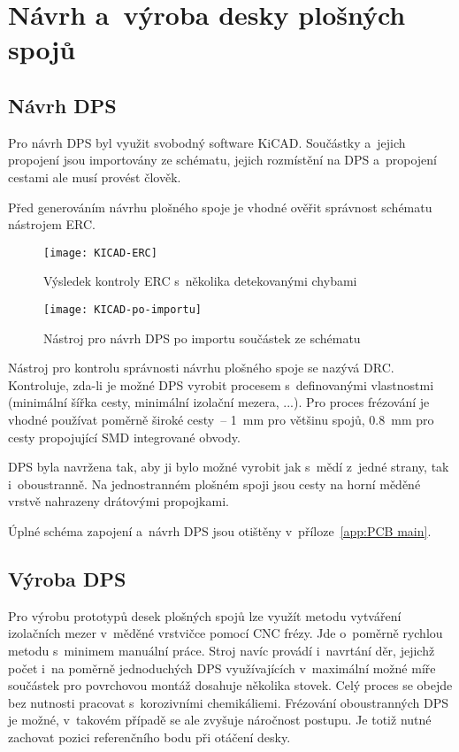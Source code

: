 \section{Návrh a~výroba desky plošných spojů}
\subsection{Návrh DPS}
Pro návrh DPS byl využit svobodný software KiCAD. Součástky a~jejich propojení
jsou importovány ze schématu, jejich rozmístění na DPS a~propojení cestami ale
musí provést člověk.

Před generováním návrhu plošného spoje je vhodné ověřit správnost schématu
nástrojem \ac{ERC}.

\begin{figure}[htbp]
    \centering
    \texttt{[image: KICAD-ERC]}
    \caption{Výsledek kontroly \acs{ERC} s~několika detekovanými chybami}
    \label{fig:kicad ERC}
\end{figure}

\begin{figure}[htbp]
    \centering
    \texttt{[image: KICAD-po-importu]}
    \caption{%
        Nástroj pro návrh DPS  po importu součástek ze
        schématu
    }
    \label{fig:kicad po importu}
\end{figure}

Nástroj pro kontrolu správnosti návrhu plošného spoje se nazývá \ac{DRC}.
Kontroluje, zda-li je možné DPS vyrobit procesem s~definovanými vlastnostmi
(minimální šířka cesty, minimální izolační mezera, ...). Pro proces frézování
je vhodné používat poměrně široké cesty~-- \SI{1}{\milli\meter} pro většinu
spojů, \SI{0,8}{\milli\meter} pro cesty propojující SMD integrované obvody.

DPS byla navržena tak, aby ji bylo možné vyrobit jak s~mědí z~jedné strany,
tak i~oboustranně. Na jednostranném plošném spoji jsou cesty na horní měděné
vrstvě nahrazeny drátovými propojkami.

Úplné schéma zapojení a~návrh DPS jsou otištěny v~příloze~\vref{app:PCB main}.


\subsection{Výroba DPS}
Pro výrobu prototypů desek plošných spojů lze využít metodu vytváření
izolačních mezer v~měděné vrstvičce pomocí CNC frézy. Jde o~poměrně rychlou
metodu s~minimem manuální práce. Stroj navíc provádí i~navrtání děr, jejichž
počet i~na poměrně jednoduchých DPS využívajících v~maximální možné míře
součástek pro povrchovou montáž dosahuje několika stovek. Celý proces se obejde
bez nutnosti pracovat s~korozivními chemikáliemi. Frézování oboustranných DPS
je možné, v~takovém případě se ale zvyšuje náročnost postupu. Je totiž nutné
zachovat pozici referenčního bodu při otáčení desky.

